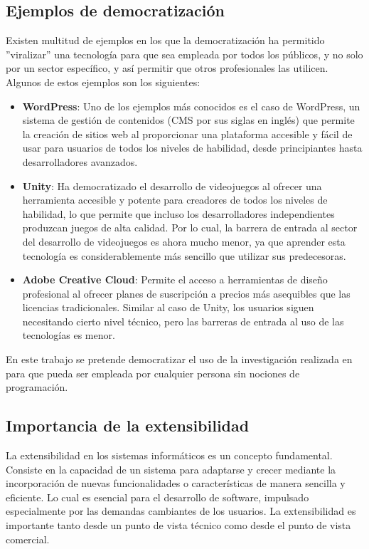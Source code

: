 \subsection{Ejemplos de democratización}

Existen multitud de ejemplos en los que la democratización ha permitido ''viralizar'' una tecnología para que sea empleada por todos los públicos, y no solo por un sector específico, y así permitir que otros profesionales las utilicen. Algunos de estos ejemplos son los siguientes: 

\begin{itemize}
	
	\item \textbf{WordPress}: Uno de los ejemplos más conocidos es el caso de WordPress, un sistema de gestión de contenidos (CMS por sus siglas en inglés) que permite la creación de sitios web al proporcionar una plataforma accesible y fácil de usar para usuarios de todos los niveles de habilidad, desde principiantes hasta desarrolladores avanzados.
	
	\item \textbf{Unity}: Ha democratizado el desarrollo de videojuegos al ofrecer una herramienta accesible y potente para creadores de todos los niveles de habilidad, lo que permite que incluso los desarrolladores independientes produzcan juegos de alta calidad. Por lo cual, la barrera de entrada al sector del desarrollo de videojuegos es ahora mucho menor, ya que aprender esta tecnología es considerablemente más sencillo que utilizar sus predecesoras.
	
	\item \textbf{Adobe Creative Cloud}: Permite el acceso a herramientas de diseño profesional al ofrecer planes de suscripción a precios más asequibles que las licencias tradicionales. Similar al caso de Unity, los usuarios siguen necesitando cierto nivel técnico, pero las barreras de entrada al uso de las tecnologías es menor.

	
\end{itemize}

En este trabajo se pretende democratizar el uso de la investigación realizada en \ga para que pueda ser empleada por cualquier persona sin nociones de programación.

\subsection{Importancia de la extensibilidad}

La extensibilidad en los sistemas informáticos es un concepto fundamental. Consiste en la capacidad de un sistema para adaptarse y crecer mediante la incorporación de nuevas funcionalidades o características de manera sencilla y eficiente. Lo cual es esencial para el desarrollo de software, impulsado especialmente por las demandas cambiantes de los usuarios. La extensibilidad es importante tanto desde un punto de vista técnico como desde el punto de vista comercial.

